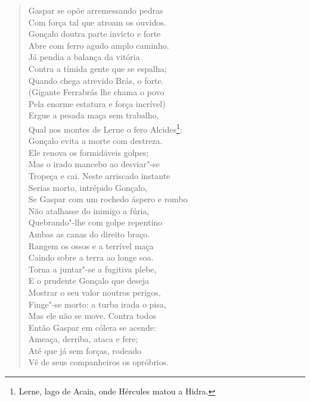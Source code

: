 \begin{verse}
Gaspar se opõe arremessando pedras\\
Com força tal que atroam os ouvidos.\\
Gonçalo doutra parte invicto e forte\\
Abre com ferro agudo amplo caminho.\\
Já pendia a balança da vitória\\
Contra a tímida gente que se espalha;\\
Quando chega atrevido Brás, o forte.\\
(Gigante Ferrabrás lhe chama o povo\\
Pela enorme estatura e força incrível)\\
Ergue a pesada maça sem trabalho,\\
Qual nos montes de Lerne o fero Alcides\footnote{ Lerne, lago de Acaia, onde Hércules matou a Hidra.}:\\	\index{\Alcid}
Gonçalo evita a morte com destreza.\\
Ele renova os formidáveis golpes;\\
Mas o irado mancebo ao desviar"-se\\
Tropeça e cai. Neste arriscado instante\\
Serias morto, intrépido Gonçalo,\\
Se Gaspar com um rochedo áspero e rombo\\
Não atalhasse do inimigo a fúria,\\
Quebrando"-lhe com golpe repentino\\
Ambas as canas do direito braço.\\
Rangem os ossos e a terrível maça\\
Caindo sobre a terra ao longe soa.\\
Torna a juntar"-se a fugitiva plebe,\\
E o prudente Gonçalo que deseja\\
Mostrar o seu valor noutros perigos,\\
Finge"-se morto: a turba irada o pisa,\\
Mas ele não se move. Contra todos\\
Então Gaspar em cólera se acende:\\
Ameaça, derriba, ataca e fere;\\
Até que já sem forças, rodeado\\
Vê de seus companheiros os opróbrios. \\[10pt]



\end{verse}
